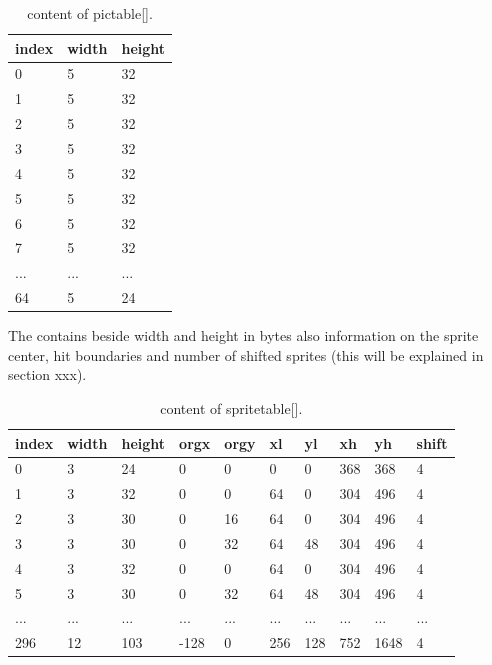 \documentclass[book.tex]{subfiles}
\begin{document}
  \begin{table}[H]
  \begin{tabularx}{0.8\textwidth}[c]{XXX}
  \hline
  \textbf{index} & \textbf{width} & \textbf{height}   \\ \hline
  0             & 5          & 32    \\
  1             & 5          & 32    \\
  2             & 5          & 32    \\
  3             & 5          & 32    \\
  4             & 5          & 32    \\
  5             & 5          & 32    \\
  6             & 5          & 32    \\
  7             & 5          & 32    \\
  ...             & ...          & ...    \\
  64             & 5          & 24    \\
  \end{tabularx}
  \caption{content of pictable[].}
  \end{table}



The  contains beside width and height in bytes also information on the sprite center, hit boundaries and number of shifted sprites (this will be explained in section xxx). \\

\begin{table}[H]
  \begin{tabularx}{\textwidth}[c]{lXXXXXXXXX}
  \hline
  \textbf{index} & \textbf{width} & \textbf{height} & \textbf{orgx} & \textbf{orgy}
    & \textbf{xl} & \textbf{yl} & \textbf{xh} & \textbf{yh} & \textbf{shift} \\ \hline
  0  &   3  &   24  &   0  &   0  &   0  &   0  &   368  &   368  &   4 \\
  1  &   3  &   32  &   0  &   0  &   64  &   0  &   304  &   496  &   4 \\
  2  &   3  &   30  &   0  &   16  &   64  &   0  &   304  &   496  &   4 \\
  3  &   3  &   30  &   0  &   32  &   64  &   48  &   304  &   496  &   4 \\
  4  &   3  &   32  &   0  &   0  &   64  &   0  &   304  &   496  &   4 \\
  5  &   3  &   30  &   0  &   32  &   64  &   48  &   304  &   496  &   4 \\
 ...  &   ...  &   ...  &   ...  &   ...  &   ...  &   ...  &   ...  &   ...  &   ... \\
 296  &   12  &   103  &   -128  &   0  &   256  &   128  &   752  &   1648  &   4\\
  \end{tabularx}
  \caption{content of spritetable[].}
  \end{table}
\end{document}
